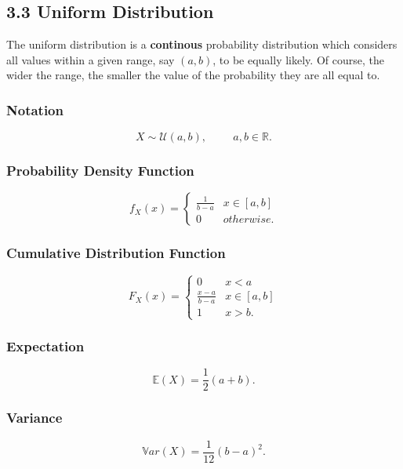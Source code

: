 \documentclass[11pt]{article}
\begin{document}
\subsection*{3.3 Uniform Distribution}
The uniform distribution is a \textbf{continous} probability distribution which considers all values within a given range, say $(a,b)$, to be equally likely. Of course, the wider the range, the smaller the value of the probability they are all equal to.

\subsubsection*{Notation}
\begin{equation}
    X \sim \mathcal{U}(a, b), \hspace{1cm} a,b \in \mathbb{R}.
\end{equation}

\subsubsection*{Probability Density Function}
\begin{equation}
    f_X(x) = 
    \begin{cases} 
      \frac{1}{b-a} & x\in [a,b] \\
      0 & otherwise.
   \end{cases}
\end{equation}

\subsubsection*{Cumulative Distribution Function}
\begin{equation}
    F_X(x) = 
    \begin{cases} 
        0 & x < a \\
      \frac{x-a}{b-a} & x\in [a,b] \\
      1 & x > b.
   \end{cases}
\end{equation}

\subsubsection*{Expectation}
\begin{equation}
    \mathbb{E}(X) = \frac{1}{2} (a+b).
\end{equation}

\subsubsection*{Variance}
\begin{equation}
    \mathbb{V}ar(X) = \frac{1}{12} (b - a)^2.
\end{equation}
\end{document}
